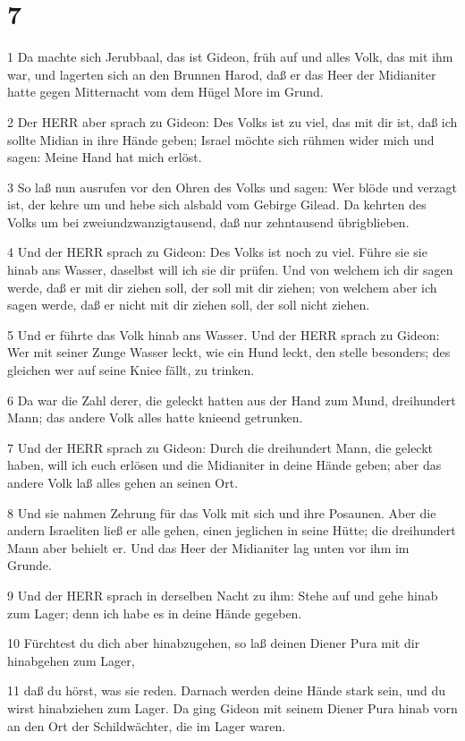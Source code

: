 \chapter{7}

\par 1 Da machte sich Jerubbaal, das ist Gideon, früh auf und alles Volk, das mit ihm war, und lagerten sich an den Brunnen Harod, daß er das Heer der Midianiter hatte gegen Mitternacht vom dem Hügel More im Grund.
\par 2 Der HERR aber sprach zu Gideon: Des Volks ist zu viel, das mit dir ist, daß ich sollte Midian in ihre Hände geben; Israel möchte sich rühmen wider mich und sagen: Meine Hand hat mich erlöst.
\par 3 So laß nun ausrufen vor den Ohren des Volks und sagen: Wer blöde und verzagt ist, der kehre um und hebe sich alsbald vom Gebirge Gilead. Da kehrten des Volks um bei zweiundzwanzigtausend, daß nur zehntausend übrigblieben.
\par 4 Und der HERR sprach zu Gideon: Des Volks ist noch zu viel. Führe sie sie hinab ans Wasser, daselbst will ich sie dir prüfen. Und von welchem ich dir sagen werde, daß er mit dir ziehen soll, der soll mit dir ziehen; von welchem aber ich sagen werde, daß er nicht mit dir ziehen soll, der soll nicht ziehen.
\par 5 Und er führte das Volk hinab ans Wasser. Und der HERR sprach zu Gideon: Wer mit seiner Zunge Wasser leckt, wie ein Hund leckt, den stelle besonders; des gleichen wer auf seine Kniee fällt, zu trinken.
\par 6 Da war die Zahl derer, die geleckt hatten aus der Hand zum Mund, dreihundert Mann; das andere Volk alles hatte knieend getrunken.
\par 7 Und der HERR sprach zu Gideon: Durch die dreihundert Mann, die geleckt haben, will ich euch erlösen und die Midianiter in deine Hände geben; aber das andere Volk laß alles gehen an seinen Ort.
\par 8 Und sie nahmen Zehrung für das Volk mit sich und ihre Posaunen. Aber die andern Israeliten ließ er alle gehen, einen jeglichen in seine Hütte; die dreihundert Mann aber behielt er. Und das Heer der Midianiter lag unten vor ihm im Grunde.
\par 9 Und der HERR sprach in derselben Nacht zu ihm: Stehe auf und gehe hinab zum Lager; denn ich habe es in deine Hände gegeben.
\par 10 Fürchtest du dich aber hinabzugehen, so laß deinen Diener Pura mit dir hinabgehen zum Lager,
\par 11 daß du hörst, was sie reden. Darnach werden deine Hände stark sein, und du wirst hinabziehen zum Lager. Da ging Gideon mit seinem Diener Pura hinab vorn an den Ort der Schildwächter, die im Lager waren.
